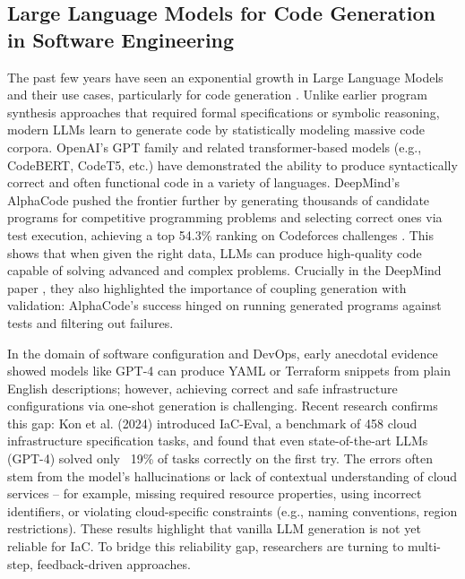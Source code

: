 \documentclass[manuscript,screen,nonacm]{acmart}
\begin{document}
\subsection{Large Language Models for Code Generation in Software Engineering}
The past few years have seen an exponential growth in Large Language Models and their use cases, particularly for code generation \cite{dong2025survey}. Unlike earlier program synthesis approaches that required formal specifications or symbolic reasoning, modern LLMs learn to generate code by statistically modeling massive code corpora. OpenAI’s GPT family and related transformer-based models (e.g., CodeBERT, CodeT5, etc.) have demonstrated the ability to produce syntactically correct and often functional code in a variety of languages. DeepMind’s AlphaCode pushed the frontier further by generating thousands of candidate programs for competitive programming problems and selecting correct ones via test execution, achieving a top 54.3\% ranking on Codeforces challenges \cite{li2022competition}. This shows that when given the right data, LLMs can produce high-quality code capable of solving advanced and complex problems. Crucially in the DeepMind paper \cite{li2022competition}, they also highlighted the importance of coupling generation with validation: AlphaCode’s success hinged on running generated programs against tests and filtering out failures. 

In the domain of software configuration and DevOps, early anecdotal evidence showed models like GPT-4 can produce YAML or Terraform snippets from plain English descriptions; however, achieving correct and safe infrastructure configurations via one-shot generation is challenging. Recent research confirms this gap: Kon et al. (2024) \cite{kon2024iac} introduced IaC-Eval, a benchmark of 458 cloud infrastructure specification tasks, and found that even state-of-the-art LLMs (GPT-4) solved only ~19\% of tasks correctly on the first try. The errors often stem from the model’s hallucinations or lack of contextual understanding of cloud services – for example, missing required resource properties, using incorrect identifiers, or violating cloud-specific constraints (e.g., naming conventions, region restrictions). These results highlight that vanilla LLM generation is not yet reliable for IaC. To bridge this reliability gap, researchers are turning to multi-step, feedback-driven approaches. 
\end{document}
